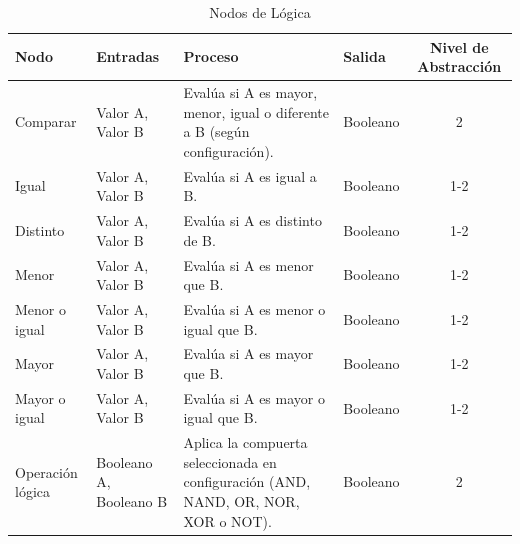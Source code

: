 \begin{table}[H]
    \centering
    \caption{Nodos de Lógica}
    \begin{tabularx}{\textwidth}{ l X X X c }
        \hline
        \textbf{Nodo}    & \textbf{Entradas}                                             & \textbf{Proceso}                                                                   & \textbf{Salida} & \textbf{Nivel de Abstracción} \\ \hline
        Comparar         & Valor A, Valor B                                              & Evalúa si A es mayor, menor, igual o diferente a B (según configuración).          & Booleano        & 2                             \\
        Igual            & Valor A, Valor B                                              & Evalúa si A es igual a B.                                                          & Booleano        & 1-2                           \\
        Distinto         & Valor A, Valor B                                              & Evalúa si A es distinto de B.                                                      & Booleano        & 1-2                           \\
        Menor            & Valor A, Valor B                                              & Evalúa si A es menor que B.                                                        & Booleano        & 1-2                           \\
        Menor o igual    & Valor A, Valor B                                              & Evalúa si A es menor o igual que B.                                                & Booleano        & 1-2                           \\
        Mayor            & Valor A, Valor B                                              & Evalúa si A es mayor que B.                                                        & Booleano        & 1-2                           \\
        Mayor o igual    & Valor A, Valor B                                              & Evalúa si A es mayor o igual que B.                                                & Booleano        & 1-2                           \\
        Operación lógica & Booleano A, Booleano B                                        & Aplica la compuerta seleccionada en configuración (AND, NAND, OR, NOR, XOR o NOT). & Booleano        & 2                             \\

\end{tabularx}
\end{table}
